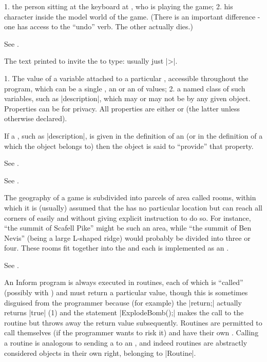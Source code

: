 %
1. the person sitting at the keyboard at , who is playing
the game; 2. his character inside the model world of the game.  (There is an
important difference - one has access to the ``undo'' verb.  The other
actually dies.)

%
See .

%
The text printed to invite the  to type: usually just |>|.

%
1. The value of a variable attached to a particular , accessible
throughout the program, which can be a single , an  or an  of values; 2. a named class of such variables,
such as |description|, which may or may not be  by any given
object.  Properties can be  for privacy.  All properties
are either  or  (the latter unless otherwise
declared).

%
If a , such as |description|, is given in the definition of
an  (or in the definition of a  which the object belongs
to) then the object is said to ``provide'' that property.

%
See .

%
See .

%
The geography of a game is subdivided into parcels of area called rooms,
within which it is (usually) assumed that the  has no particular
location but can reach all corners of easily and without giving explicit
instruction to do so.  For instance, ``the summit of Scafell Pike'' might be
such an area, while ``the summit of Ben Nevis'' (being a large L-shaped
ridge) would probably be divided into three or four.  These rooms fit
together into the  and each is implemented as an .

%
See .

%
An Inform program is always executed in routines, each of which is ``called''
(possibly with ) and must return a particular  value,
though this is sometimes disguised from the programmer because (for example)
the  |return;| actually returns |true| (1) and the statement
|ExplodeBomb();| makes the call to the routine but throws away the return
value subsequently.  Routines are permitted to call themselves (if the
programmer wants to risk it) and have their own .
Calling a routine is analogous to sending a  to an ,
and indeed routines are abstractly considered objects in their own right,
belonging to  |Routine|.

